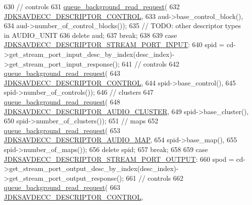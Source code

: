 \begin{DoxyCode}
630         \textcolor{comment}{// controls}
631         \hyperlink{classavdecc__lib_1_1end__station__imp_a5dcbf7253fe2b67afcc2c41cc9afe826}{queue\_background\_read\_request}(
632             \hyperlink{group__descriptor_gaafb6bdc564bbe2b62cb6f91bdb8185a8}{JDKSAVDECC\_DESCRIPTOR\_CONTROL},
633             aud->base\_control\_block(),
634             aud->number\_of\_control\_blocks());
635         \textcolor{comment}{// TODO: other descriptor types in AUDIO\_UNIT}
636         \textcolor{keyword}{delete} aud;
637         \textcolor{keywordflow}{break};
638 
639     \textcolor{keywordflow}{case} \hyperlink{group__descriptor_gabf97c9389e49a8c27f2192854f830eda}{JDKSAVDECC\_DESCRIPTOR\_STREAM\_PORT\_INPUT}:
640         spid = cd->get\_stream\_port\_input\_desc\_by\_index(desc\_index)->get\_stream\_port\_input\_response();
641         \textcolor{comment}{// controls}
642         \hyperlink{classavdecc__lib_1_1end__station__imp_a5dcbf7253fe2b67afcc2c41cc9afe826}{queue\_background\_read\_request}(
643             \hyperlink{group__descriptor_gaafb6bdc564bbe2b62cb6f91bdb8185a8}{JDKSAVDECC\_DESCRIPTOR\_CONTROL},
644             spid->base\_control(),
645             spid->number\_of\_controls());
646         \textcolor{comment}{// clusters}
647         \hyperlink{classavdecc__lib_1_1end__station__imp_a5dcbf7253fe2b67afcc2c41cc9afe826}{queue\_background\_read\_request}(
648             \hyperlink{group__descriptor_ga3ed17cacf96ccf5d857a20c71d02f426}{JDKSAVDECC\_DESCRIPTOR\_AUDIO\_CLUSTER},
649             spid->base\_cluster(),
650             spid->number\_of\_clusters());
651         \textcolor{comment}{// maps}
652         \hyperlink{classavdecc__lib_1_1end__station__imp_a5dcbf7253fe2b67afcc2c41cc9afe826}{queue\_background\_read\_request}(
653             \hyperlink{group__descriptor_ga8b923dc5b431ec457fc26e0dcfa88104}{JDKSAVDECC\_DESCRIPTOR\_AUDIO\_MAP},
654             spid->base\_map(),
655             spid->number\_of\_maps());
656         \textcolor{keyword}{delete} spid;
657         \textcolor{keywordflow}{break};
658 
659     \textcolor{keywordflow}{case} \hyperlink{group__descriptor_gab28f87a9e7610f8441c1c4840d2c2fb9}{JDKSAVDECC\_DESCRIPTOR\_STREAM\_PORT\_OUTPUT}:
660         spod = cd->get\_stream\_port\_output\_desc\_by\_index(desc\_index)->get\_stream\_port\_output\_response();
661         \textcolor{comment}{// controls}
662         \hyperlink{classavdecc__lib_1_1end__station__imp_a5dcbf7253fe2b67afcc2c41cc9afe826}{queue\_background\_read\_request}(
663             \hyperlink{group__descriptor_gaafb6bdc564bbe2b62cb6f91bdb8185a8}{JDKSAVDECC\_DESCRIPTOR\_CONTROL},

\end{DoxyCode}
